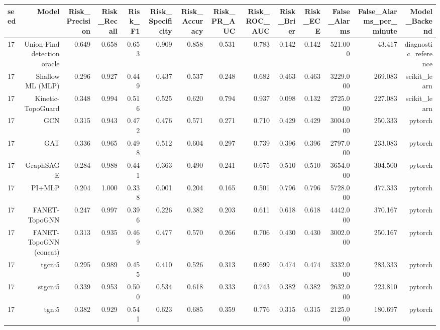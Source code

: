 \begin{tabular}{lrrrrrrrrrrrrr}
\toprule
seed & Model & Risk\_Precision & Risk\_Recall & Risk\_F1 & Risk\_Specificity & Risk\_Accuracy & Risk\_PR\_AUC & Risk\_ROC\_AUC & Risk\_Brier & Risk\_ECE & False\_Alarms & False\_Alarms\_per\_minute & Model\_Backend \\
\midrule
17 & Union-Find detection oracle & 0.649 & 0.658 & 0.653 & 0.909 & 0.858 & 0.531 & 0.783 & 0.142 & 0.142 & 521.000 & 43.417 & diagnostic\_reference \\
17 & Shallow ML (MLP) & 0.296 & 0.927 & 0.449 & 0.437 & 0.537 & 0.248 & 0.682 & 0.463 & 0.463 & 3229.000 & 269.083 & scikit\_learn \\
17 & Kinetic-TopoGuard & 0.348 & 0.994 & 0.516 & 0.525 & 0.620 & 0.794 & 0.937 & 0.098 & 0.132 & 2725.000 & 227.083 & scikit\_learn \\
17 & GCN & 0.315 & 0.943 & 0.472 & 0.476 & 0.571 & 0.271 & 0.710 & 0.429 & 0.429 & 3004.000 & 250.333 & pytorch \\
17 & GAT & 0.336 & 0.965 & 0.498 & 0.512 & 0.604 & 0.297 & 0.739 & 0.396 & 0.396 & 2797.000 & 233.083 & pytorch \\
17 & GraphSAGE & 0.284 & 0.988 & 0.441 & 0.363 & 0.490 & 0.241 & 0.675 & 0.510 & 0.510 & 3654.000 & 304.500 & pytorch \\
17 & PI+MLP & 0.204 & 1.000 & 0.338 & 0.001 & 0.204 & 0.165 & 0.501 & 0.796 & 0.796 & 5728.000 & 477.333 & pytorch \\
17 & FANET-TopoGNN & 0.247 & 0.997 & 0.396 & 0.226 & 0.382 & 0.203 & 0.611 & 0.618 & 0.618 & 4442.000 & 370.167 & pytorch \\
17 & FANET-TopoGNN (concat) & 0.313 & 0.935 & 0.469 & 0.477 & 0.570 & 0.266 & 0.706 & 0.430 & 0.430 & 3002.000 & 250.167 & pytorch \\
17 & tgcn:5 & 0.295 & 0.989 & 0.455 & 0.410 & 0.526 & 0.313 & 0.699 & 0.474 & 0.474 & 3332.000 & 283.333 & pytorch \\
17 & stgcn:5 & 0.339 & 0.953 & 0.500 & 0.534 & 0.618 & 0.333 & 0.743 & 0.382 & 0.382 & 2632.000 & 223.810 & pytorch \\
17 & tgn:5 & 0.382 & 0.929 & 0.541 & 0.623 & 0.685 & 0.359 & 0.776 & 0.315 & 0.315 & 2125.000 & 180.697 & pytorch \\
\bottomrule
\end{tabular}